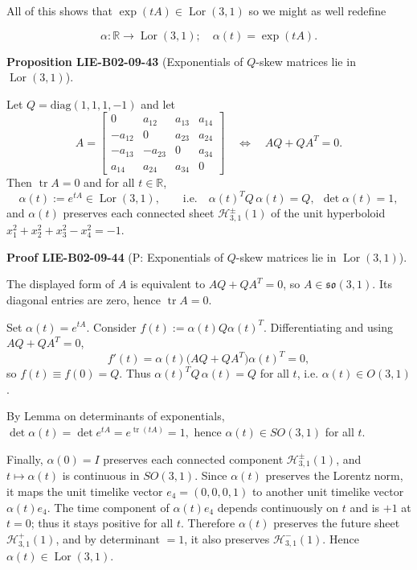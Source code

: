 \documentclass[10pt, letterpaper]{article}
\newcommand{\CustomHeading}[3]{%
  \par\medskip\noindent%
  \textbf{#1 #2} \textnormal{(#3)}.\enskip%
}
\newenvironment{PROP}[2]{\begin{unitbox}\CustomHeading{Proposition}{#1}{#2}}{\end{unitbox}}
\newenvironment{PROOF}[2]{\begin{unitbox}\CustomHeading{Proof}{#1}{#2}}{\end{unitbox}}
\begin{document}
All of this shows that $\exp (t A) \in \operatorname{Lor}(3,1)$ so we might as well redefine

$$
\alpha: \mathbb{R} \longrightarrow \operatorname{Lor}(3,1) ; \quad \alpha(t)=\exp (t A) .
$$



\begin{PROP}{LIE-B02-09-43}{Exponentials of \(Q\)-skew matrices lie in \(\operatorname{Lor}(3,1)\)}
Let \(Q=\mathrm{diag}(1,1,1,-1)\) and let
\[
A=
\begin{bmatrix}
0 & a_{12} & a_{13} & a_{14}\\
-a_{12} & 0 & a_{23} & a_{24}\\
-a_{13} & -a_{23} & 0 & a_{34}\\
a_{14} & a_{24} & a_{34} & 0
\end{bmatrix}
\quad\Longleftrightarrow\quad
AQ+QA^{T}=0 .
\]
Then \(\operatorname{tr}A=0\) and for all \(t\in\mathbb{R}\),
\[
\alpha(t):= e^{tA}\in \operatorname{Lor}(3,1),
\qquad\text{i.e.}\quad
\alpha(t)^{T}Q\,\alpha(t)=Q,\ \ \det\alpha(t)=1,
\]
and \(\alpha(t)\) preserves each connected sheet \(\mathcal{H}_{3,1}^{\pm}(1)\) of the unit
hyperboloid \(x_1^2+x_2^2+x_3^2-x_4^2=-1\).
\end{PROP}



\begin{PROOF}{LIE-B02-09-44}{P: Exponentials of \(Q\)-skew matrices lie in \(\operatorname{Lor}(3,1)\)}
The displayed form of \(A\) is equivalent to \(AQ+QA^{T}=0\), so \(A\in\mathfrak{so}(3,1)\).
Its diagonal entries are zero, hence \(\operatorname{tr}A=0\).

Set \(\alpha(t)=e^{tA}\). Consider
\(
f(t):=\alpha(t)Q\alpha(t)^{T}.
\)
Differentiating and using \(AQ+QA^{T}=0\),
\[
f'(t)=\alpha(t)\bigl(AQ+QA^{T}\bigr)\alpha(t)^{T}=0,
\]
so \(f(t)\equiv f(0)=Q\). Thus \(\alpha(t)^{T}Q\,\alpha(t)=Q\) for all \(t\), i.e. \(\alpha(t)\in O(3,1)\).

By Lemma on determinants of exponentials,
\(
\det\alpha(t)=\det e^{tA}=e^{\operatorname{tr}(tA)}=1,
\)
hence \(\alpha(t)\in SO(3,1)\) for all \(t\).

Finally, \(\alpha(0)=I\) preserves each connected component \(\mathcal{H}_{3,1}^{\pm}(1)\),
and \(t\mapsto \alpha(t)\) is continuous in \(SO(3,1)\). Since \(\alpha(t)\) preserves the
Lorentz norm, it maps the unit timelike vector \(e_4=(0,0,0,1)\) to another unit timelike
vector \(\alpha(t)e_4\). The time component of \(\alpha(t)e_4\) depends continuously on \(t\)
and is \(+1\) at \(t=0\); thus it stays positive for all \(t\). Therefore \(\alpha(t)\) preserves
the future sheet \(\mathcal{H}_{3,1}^{+}(1)\), and by determinant \(=1\), it also preserves
\(\mathcal{H}_{3,1}^{-}(1)\). Hence \(\alpha(t)\in \operatorname{Lor}(3,1)\).
\end{PROOF}
\end{document}
